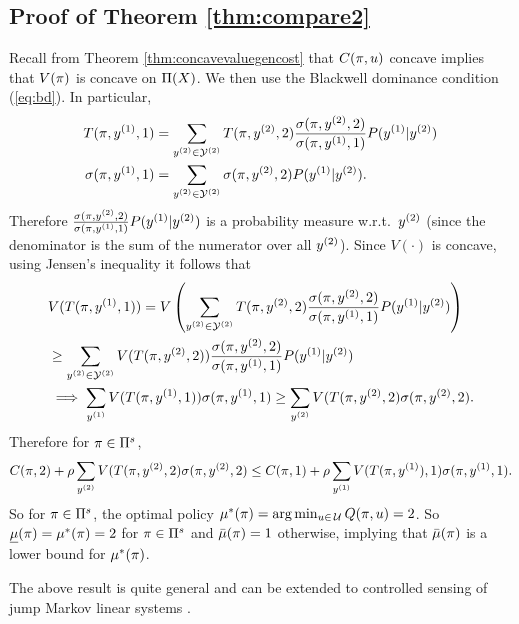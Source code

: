 \documentclass[draftcls,onecolumn]{IEEEtran}
\begin{document}
\subsection{Proof of Theorem  \ref{thm:compare2}}
 

Recall from Theorem \ref{thm:concavevaluegencost} %
 that $C(\pi,u)$ concave implies that   $V(\pi)$ is concave on $\Pi(X)$. 
We then use the Blackwell dominance condition (\ref{eq:bd}). In particular,
\begin{align*} T(\pi,y^{(1)},1) &=   \sum_{y^{(2)} \in \mathcal{Y}^{(2)}} T(\pi,y^{(2)},2) \frac{\sigma(\pi,y^{(2)},2)}{\sigma(\pi,y^{(1)},1)} P(y^{(1)}|y^{(2)})  \\
 \sigma(\pi,y^{(1)},1) &= \sum_{y^{(2)} \in \mathcal{Y}^{(2)}} \sigma(\pi,y^{(2)},2) P(y^{(1)}|y^{(2)}). \end{align*}
Therefore $\frac{\sigma(\pi,y^{(2)},2)}{\sigma(\pi,y^{(1)},1)} P(y^{(1)}|y^{(2)}) $ is a probability measure w.r.t.\  $y^{(2)}$ (since the denominator is the sum
of the numerator over all $y^{(2)}$).
Since $V(\cdot)$ is concave, using Jensen's inequality it follows that
\begin{align}
&V(T(\pi,y^{(1)},1) )  = V \left(\sum_{y^{(2)} \in \mathcal{Y}^{(2)}} T(\pi,y^{(2)},2) \frac{\sigma(\pi,y^{(2)},2)}{\sigma(\pi,y^{(1)},1)} P(y^{(1)}|y^{(2)}) \right)\nonumber  \\
&\geq \sum_{y^{(2)} \in \mathcal{Y}^{(2)}}  V (T(\pi,y^{(2)},2)) \frac{\sigma(\pi,y^{(2)},2)}{\sigma(\pi,y^{(1)},1)} P(y^{(1)}|y^{(2)}) \nonumber \\
&\implies   \sum_{y^{(1)}}  V(T(\pi,y^{(1)},1) ) \sigma(\pi,y^{(1)},1) \geq
\sum_{y^{(2)}} V(T(\pi,y^{(2)},2)\sigma(\pi,y^{(2)},2). \label{eq:bdproof1}
\end{align}
Therefore for $\pi \in \Pi^s$, 
$$ C(\pi,2) + \rho\sum_{y^{(2)}} V(T(\pi,y^{(2)},2)\sigma(\pi,y^{(2)},2) \leq 
C(\pi,1) + \rho \sum_{y^{(1)}}  V(T(\pi,y^{(1)}),1 ) \sigma(\pi,y^{(1)},1) . $$
So for $\pi \in \Pi^s$, the optimal policy $\mu^*(\pi) = \arg\min_{u \in \,\mathcal{U}}Q(\pi,u) = 2$.
So $\underline{\mu}(\pi) = \mu^*(\pi)=2$ for $\pi \in \Pi^s$ and $\bar{\mu}(\pi)=1$ otherwise, implying that
$\bar{\mu}(\pi)$ is a lower  bound for $\mu^*(\pi)$.

The above result is quite general and can be extended to  controlled sensing of  jump Markov linear systems \cite{DGK01,LK99,EKN05}.
\end{document}
